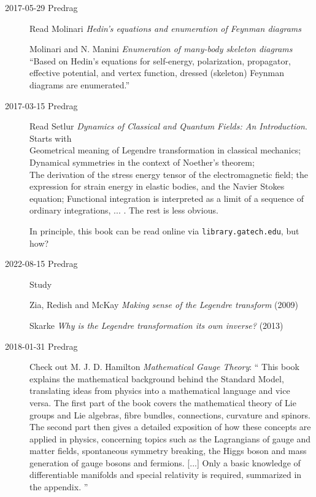\begin{description}
\item[2017-05-29 Predrag] Read
Molinari
{\em Hedin's equations and enumeration of {Feynman} diagrams}

Molinari and N. Manini
{\em Enumeration of many-body skeleton diagrams}
``Based on Hedin's equations for self-energy, polarization, propagator,
effective potential, and vertex function, dressed (skeleton) Feynman
diagrams are enumerated.''

\item[2017-03-15 Predrag] Read
Setlur
{\em Dynamics of Classical and Quantum Fields: An Introduction}.
Starts with
\\
Geometrical meaning of Legendre transformation in classical mechanics;
\\
Dynamical symmetries in the context of Noether's theorem;
\\
The derivation of the stress energy tensor of the electromagnetic field;
the expression for strain energy in elastic bodies, and the Navier Stokes
equation;
Functional integration is interpreted as a limit of a sequence of
ordinary integrations, ... .
The rest is less obvious.

In principle, this book can be read online via
\texttt{library.gatech.edu}, but how?

\item[2022-08-15 Predrag] Study

Zia, Redish and McKay
{\em Making sense of the {Legendre} transform} (2009)

Skarke
{\em Why is the {Legendre} transformation its own inverse?}
(2013)

\item[2018-01-31 Predrag] Check out
M. J. D. Hamilton
{\em Mathematical Gauge Theory}: ``
This book explains the mathematical background behind the Standard Model,
translating ideas from physics into a mathematical language and vice versa.
The first part of the book covers the mathematical theory of Lie groups and
Lie algebras, fibre bundles, connections, curvature and spinors. The second
part then gives a detailed exposition of how these concepts are applied in
physics, concerning topics such as the Lagrangians of gauge and matter
fields, spontaneous symmetry breaking, the Higgs boson and mass generation of
gauge bosons and fermions.
[...] Only a basic knowledge of differentiable manifolds and special
relativity is required, summarized in the appendix.
''


\end{description}
